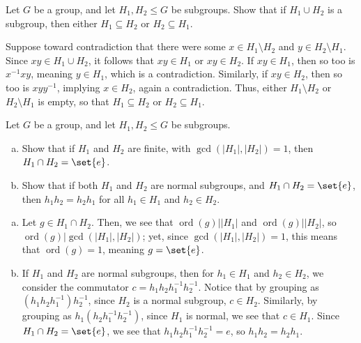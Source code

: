 \documentclass[10pt]{mypackage}
\begin{document}
\begin{problem}[Problem 2]
  Let $G$ be a group, and let $H_1,H_2\leq G$ be subgroups. Show that if $H_1\cup H_2$ is a subgroup, then either $H_1\subseteq H_2$ or $H_2\subseteq H_1$.
\end{problem}
\begin{solution}
  Suppose toward contradiction that there were some $x\in H_1\setminus H_2$ and $y\in H_2\setminus H_1$. Since $xy\in H_1\cup H_2$, it follows that $xy\in H_1$ or $xy\in H_2$. If $xy\in H_1$, then so too is $x^{-1}xy$, meaning $y\in H_1$, which is a contradiction. Similarly, if $xy\in H_2$, then so too is $xyy^{-1}$, implying $x\in H_2$, again a contradiction. Thus, either $H_1\setminus H_2$ or $H_2\setminus H_1$ is empty, so that $H_1\subseteq H_2$ or $H_2\subseteq H_1$.
\end{solution}
\begin{problem}[Problem 3]
  Let $G$ be a group, and let $H_1,H_2\leq G$ be subgroups.
  \begin{enumerate}[(a)]
    \item Show that if $H_1$ and $H_2$ are finite, with $\gcd\left(\left\vert H_1 \right\vert,\left\vert H_2 \right\vert\right) = 1$, then $H_1\cap H_2 = \set{e}$.
    \item Show that if both $H_1$ and $H_2$ are normal subgroups, and $H_1\cap H_2 = \set{e}$, then $h_1h_2 = h_2h_1$ for all $h_1\in H_1$ and $h_2\in H_2$.
  \end{enumerate}
\end{problem}
\begin{solution}\hfill
  \begin{enumerate}[(a)]
    \item Let $g\in H_1\cap H_2$. Then, we see that $\operatorname{ord}\left( g \right) | \left\vert H_1 \right\vert$ and $\operatorname{ord}\left( g \right) | \left\vert H_2 \right\vert$, so $\operatorname{ord}(g) | \gcd\left( \left\vert H_1 \right\vert,\left\vert H_2 \right\vert \right)$; yet, since $\gcd\left( \left\vert H_1 \right\vert,\left\vert H_2 \right\vert \right) = 1$, this means that $\operatorname{ord}\left( g \right) = 1$, meaning $g = \set{e}$.
    \item If $H_1$ and $H_2$ are normal subgroups, then for $h_1\in H_1$ and $h_2\in H_2$, we consider the commutator $c = h_1h_2h_1^{-1}h_2^{-1}$. Notice that by grouping as $\left( h_1h_2h_1^{-1} \right)h_2^{-1}$, since $H_2$ is a normal subgroup, $c\in H_2$. Similarly, by grouping as $h_1\left( h_2h_1^{-1}h_2^{-1} \right)$, since $H_1$ is normal, we see that $c\in H_1$. Since $H_1\cap H_2 = \set{e}$, we see that $h_1h_2h_1^{-1}h_2^{-1} = e$, so $h_1h_2 = h_2h_1$.
  \end{enumerate}
\end{solution}
\end{document}
